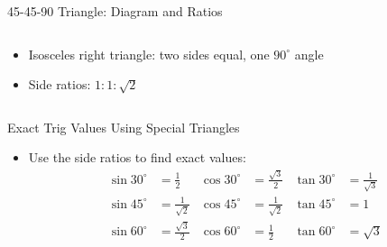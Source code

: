 \documentclass[aspectratio=169]{beamer}
\begin{document}
\begin{frame}{45-45-90 Triangle: Diagram and Ratios}
    \begin{columns}
        \begin{tcolorbox}[colback=lightgray,colframe=primary,title=45-45-90 Triangle]
            \footnotesize
            \begin{itemize}
                \item Isosceles right triangle: two sides equal, one $90^\circ$ angle
                \item Side ratios: $1 : 1 : \sqrt{2}$
            \end{itemize}
        \end{tcolorbox}
        \centering
    \end{columns}
\end{frame}

\begin{frame}{Exact Trig Values Using Special Triangles}
    \begin{tcolorbox}[colback=lightgray,colframe=primary,title=Exact Values]
        \footnotesize
        \begin{itemize}
            \item Use the side ratios to find exact values:
            \begin{align*}
                \sin 30^\circ &= \frac{1}{2} & \cos 30^\circ &= \frac{\sqrt{3}}{2} & \tan 30^\circ &= \frac{1}{\sqrt{3}} \\
                \sin 45^\circ &= \frac{1}{\sqrt{2}} & \cos 45^\circ &= \frac{1}{\sqrt{2}} & \tan 45^\circ &= 1 \\
                \sin 60^\circ &= \frac{\sqrt{3}}{2} & \cos 60^\circ &= \frac{1}{2} & \tan 60^\circ &= \sqrt{3}
            \end{align*}
        \end{itemize}
    \end{tcolorbox}
\end{frame}
\end{document}

